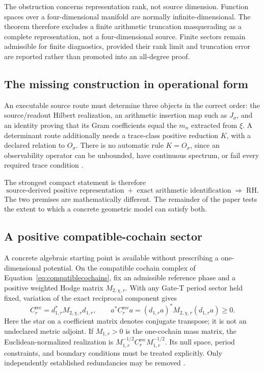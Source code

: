\documentclass[11pt,letterpaper]{article}
\numberwithin{equation}{section}
\theoremstyle{definition}
\theoremstyle{remark}
\begin{document}
The obstruction concerns representation rank, not source dimension. Function spaces over a four-dimensional manifold are normally infinite-dimensional. The theorem therefore excludes a finite arithmetic truncation masquerading as a complete representation, not a four-dimensional source. Finite sectors remain admissible for finite diagnostics, provided their rank limit and truncation error are reported rather than promoted into an all-degree proof.

\subsection{The missing construction in operational form}
An executable source route must determine three objects in the correct order: the source/readout Hilbert realization, an arithmetic insertion map such as $J_\sigma$, and an identity proving that its Gram coefficients equal the $m_n$ extracted from $\xi$. A determinant route additionally needs a trace-class positive reduction $K$, with a declared relation to $O_\sigma$. There is no automatic rule $K=O_\sigma$, since an observability operator can be unbounded, have continuous spectrum, or fail every required trace condition \cite{tcgsoperator}.

The strongest compact statement is therefore
\begin{equation}
 \boxed{\text{source-derived positive representation}
 \; +\;\text{exact arithmetic identification}
 \;\Longrightarrow\;\mathrm{RH}.}
 \label{eq:typedimplication}
\end{equation}
The two premises are mathematically different. The remainder of the paper tests the extent to which a concrete geometric model can satisfy both.

\subsection{A positive compatible-cochain sector}
\label{subsec:cochainpositive}
A concrete algebraic starting point is available without prescribing a one-dimensional potential. On the compatible cochain complex of Equation~\eqref{eq:compatiblecochains}, fix an admissible reference phase and a positive weighted Hodge matrix $M_{2,\chi,r}$. With any Gate-T period sector held fixed, variation of the exact reciprocal component gives
\begin{equation}
 C^{\mathrm{rec}}_r=d_{1,r}^{*}M_{2,\chi,r}d_{1,r},
 \qquad a^{*}C^{\mathrm{rec}}_ra
 =(d_{1,r}a)^{*}M_{2,\chi,r}(d_{1,r}a)\geq0.
 \label{eq:cochainstiffness}
\end{equation}
Here the star on a coefficient matrix denotes conjugate transpose; it is not an undeclared metric adjoint. If $M_{1,r}>0$ is the one-cochain mass matrix, the Euclidean-normalized realization is $M_{1,r}^{-1/2}C^{\mathrm{rec}}_rM_{1,r}^{-1/2}$. Its null space, period constraints, and boundary conditions must be treated explicitly. Only independently established redundancies may be removed \cite{tcgsconservative,tcgsoperator}.
\end{document}
